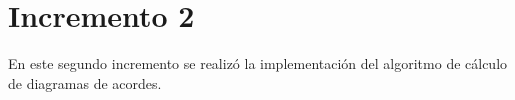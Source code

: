 \section{Incremento 2}
En este segundo incremento se realizó la implementación del algoritmo de cálculo de diagramas de acordes.



